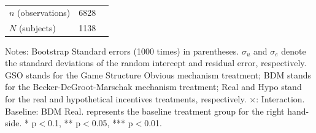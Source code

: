 \documentclass[12pt]{article}
\begin{document}
\begin{table}[H]
{\begin{tabular}{l*{1}{cc}}
\hline
\(n\) (observations)      &        6828         &            \\
\(N\) (subjects)       &        1138         &            \\
\hline \hline
\end{tabular}
}

\begin{tablenotes}
            \footnotesize
             \item Notes: Bootstrap Standard errors (1000 times) in parentheses. $\sigma_u$ and $\sigma_e$ denote the standard deviations of the random intercept and residual error, respectively. GSO stands for the Game Structure Obvious mechanism treatment; BDM stands for the Becker-DeGroot-Marschak mechanism treatment; Real and Hypo stand for the real and hypothetical incentives treatments, respectively. $\times$: Interaction. Baseline: BDM Real. represents the baseline treatment group for the right hand-side.  * p$<$0.1, ** p$<$0.05, *** p$<$0.01.
        \end{tablenotes}
\end{table}



\clearpage
\end{document}

